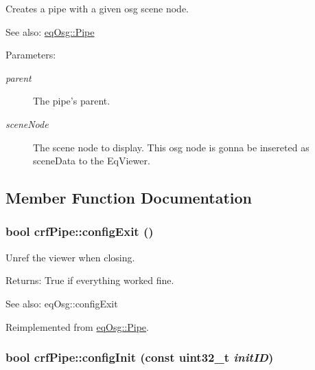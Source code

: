 Creates a pipe with a given osg scene node. 

\begin{Desc}
\item[See also:]\hyperlink{a00014}{eqOsg::Pipe} \end{Desc}
\begin{Desc}
\item[Parameters:]
\begin{description}
\item[{\em parent}]The pipe's parent. \item[{\em sceneNode}]The scene node to display. This osg node is gonna be insereted as sceneData to the EqViewer. \end{description}
\end{Desc}


\subsection{Member Function Documentation}
\hypertarget{a00006_3f48f5f5a8a455342b111f26ca1402db}{
\subsubsection[{configExit}]{\setlength{\rightskip}{0pt plus 5cm}bool crfPipe::configExit ()}}
\label{a00006_3f48f5f5a8a455342b111f26ca1402db}


Unref the viewer when closing. 

\begin{Desc}
\item[Returns:]True if everything worked fine. \end{Desc}
\begin{Desc}
\item[See also:]eqOsg::configExit \end{Desc}


Reimplemented from \hyperlink{a00014_2cb47387a7be185b1dc6d097dc4da38e}{eqOsg::Pipe}.\hypertarget{a00006_fcf11863d5370a815bd7e1216cc0f2e6}{
\subsubsection[{configInit}]{\setlength{\rightskip}{0pt plus 5cm}bool crfPipe::configInit (const uint32\_\-t {\em initID})}}
\label{a00006_fcf11863d5370a815bd7e1216cc0f2e6}



